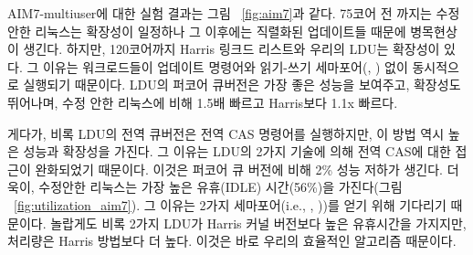 AIM7-multiuser에 대한 실험 결과는 그림 ~\ref{fig:aim7}과 같다.
75코어 전 까지는 수정 안한 리눅스는 확장성이 일정하나 그 이후에는 직렬화된 업데이트들 때문에
병목현상이 생긴다. 
하지만, 120코어까지 Harris 링크드 리스트와 우리의 LDU는 확장성이 있다. 
그 이유는 워크로드들이 업데이트 명령어와 읽기-쓰기 세마포어(,
) 없이 동시적으로 실행되기 때문이다.
LDU의 퍼코어 큐버전은 가장 좋은 성능을 보여주고, 확장성도 뛰어나며, 
수정 안한 리눅스에 비해 1.5배 빠르고 Harris보다 1.1x 빠르다.

게다가, 비록 LDU의 전역 큐버전은 전역 CAS 명령어를 실행하지만, 이 방법 역시 높은 성능과 확장성을 가진다.
그 이유는 LDU의 2가지 기술에 의해 전역 CAS에 대한 접근이 완화되었기 때문이다.
이것은 퍼코어 큐 버전에 비해 2\% 성능 저하가 생긴다. 
더욱이, 수정안한 리눅스는 가장 높은 유휴(IDLE) 시간(56\%)을 가진다(그림 ~\ref{fig:utilization_aim7}). 
그 이유는 2가지 세마포어(i.e.,
, ))를 얻기 위해 기다리기 때문이다.
놀랍게도 비록 2가지 LDU가 Harris 커널 버전보다 높은 유휴시간을 가지지만, 처리량은 Harris 방법보다 더 높다.
이것은 바로 우리의 효율적인 알고리즘 때문이다. 

